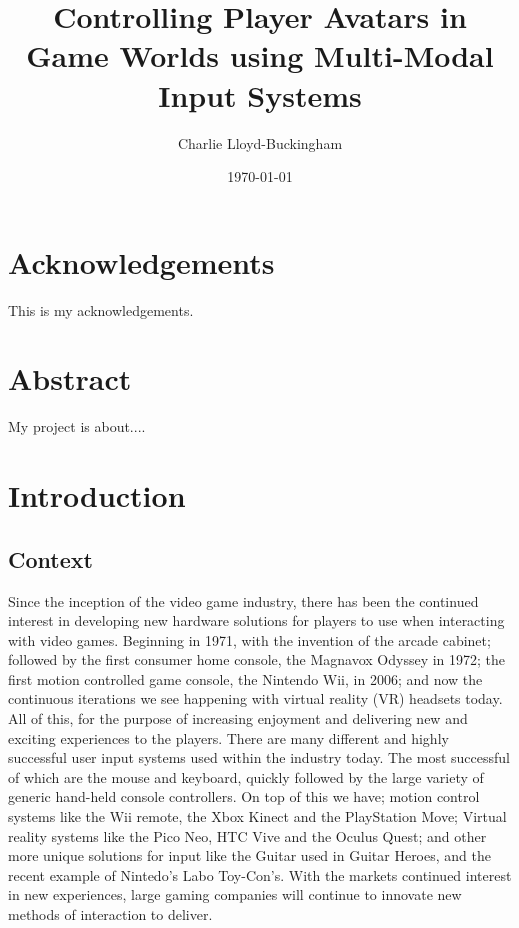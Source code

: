 \documentclass[11pt, a4paper]{article}
\title{Controlling Player Avatars in Game Worlds using Multi-Modal Input Systems}
\author{Charlie Lloyd-Buckingham}
\date{\today}
\begin{document}
\maketitle



\pagebreak
\section{Acknowledgements}	
This is my acknowledgements.

\section{Abstract}	
My project is about....



\pagebreak
\tableofcontents				%



\pagebreak
\section{Introduction}	
\subsection{Context}
Since the inception of the video game industry, there has been the continued interest in developing new hardware solutions for players to use when interacting with video games. Beginning in 1971, with the invention of the arcade cabinet; followed by the first consumer home console, the Magnavox Odyssey in 1972; the first motion controlled game console, the Nintendo Wii, in 2006; and now the continuous iterations we see happening with virtual reality (VR) headsets today. All of this, for the purpose of increasing enjoyment and delivering new and exciting experiences to the players. There are many different and highly successful user input systems used within the industry today. The most successful of which are the mouse and keyboard, quickly followed by the large variety of generic hand-held console controllers. On top of this we have; motion control systems like the Wii remote, the Xbox Kinect and the PlayStation Move; Virtual reality systems like the Pico Neo, HTC Vive and the Oculus Quest; and other more unique solutions for input like the Guitar used in Guitar Heroes, and the recent example of Nintedo's Labo Toy-Con's. With the markets continued interest in new experiences, large gaming companies will continue to innovate new methods of interaction to deliver.
\end{document}
